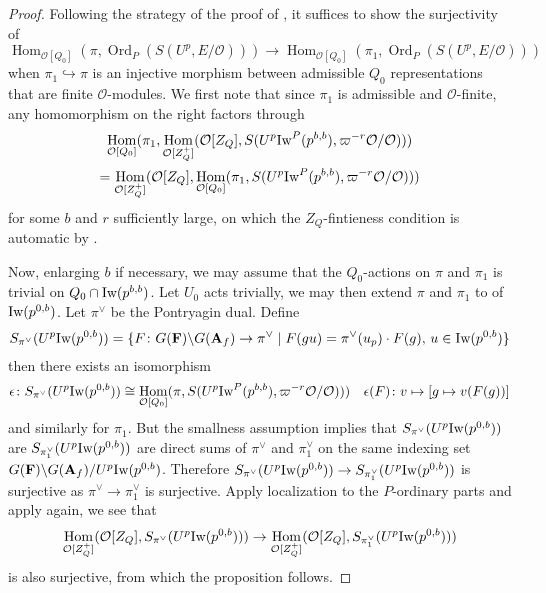 \documentclass[leqno]{amsart}
\newcommand{\Iw}{\textnormal{Iw}}
\DeclareMathOperator{\Ord}{Ord}
\newcommand{\A}{\mathbf A}
\newcommand{\F}{{\mathbf{F}}} %
\newcommand{\oo}{\mathcal{O}} %
\DeclareMathOperator{\Hom}{Hom}
\theoremstyle{definition}
\theoremstyle{remark}
\begin{document}
\begin{proof}
	Following the strategy of the proof of 
	\cite[Prop 3.2.4]{pan}, 
	it suffices to show the surjectivity of
	\[
		\Hom_{\oo[Q_0]}(\pi,\Ord_P(S(U^p,E/\oo)))\to 
		\Hom_{\oo[Q_0]}(\pi_1,\Ord_P(S(U^p,E/\oo)))
	\]
	when $\pi_{1}\hookrightarrow \pi$ 
	is an injective morphism between admissible $Q_0$
	representations that are finite $\oo$-modules.
	We first note that since $\pi_1$ is admissible
	and $\oo$-finite,
	any homomorphism on the right factors 
	through 
	\begin{multline*}
		\Hom_{\oo[Q_0]}(\pi_1,
		\Hom_{\oo[Z_Q^+]}
		(\oo[Z_Q], S(U^p\Iw^P(p^{b,b}),
		\varpi^{-r}\oo/\oo)))\\=
		\Hom_{\oo[Z_Q^+]}(\oo[Z_Q],
		\Hom_{\oo[Q_0]}(\pi_1, 
		S(U^p\Iw^P(p^{b,b}),\varpi^{-r}\oo/\oo)))
	\end{multline*}
	for some $b$ and  $r$ sufficiently large,
	on which 
	the $Z_Q$-fintieness condition is automatic
	by \cite[Lem 3.1.5]{emeI}.

	Now, enlarging $b$ if necessary,
	we may assume that 
	the $Q_0$-actions on 
	$\pi$ and $\pi_1$ is trivial on
	$Q_0\cap \Iw(p^{b,b})$. 
	Let $U_0$ acts trivially,
	we may then extend $\pi$ and  $\pi_1$
	to of $\Iw(p^{0,b})$.
	Let $\pi^\vee$ be the Pontryagin dual.
	Define
	\[
		S_{\pi^\vee}(U^p\Iw(p^{0,b}))=
		\{
			F\colon G(\F)\backslash G(\A_f)\to 
			\pi^\vee\mid 
			F(gu)=\pi^\vee(u_p)\cdot F(g),\,
			u\in \Iw(p^{0,b})
		\}
	\]
	then there exists an isomorphism
	\[
		\epsilon\colon 
		S_{\pi^\vee}(U^p\Iw(p^{0,b}))\cong 
		\Hom_{\oo[Q_0]}(\pi,
		S(U^p\Iw^P(p^{b,b}),\varpi^{-r}\oo/\oo)))
		\quad \epsilon(F)\colon
		v\mapsto [g\mapsto v(F(g))]
	\]
	and similarly for $\pi_1$.
	But the smallness assumption implies
	that $S_{\pi^\vee}(U^p\Iw(p^{0,b}))$
	are $S_{\pi_1^\vee}(U^p\Iw(p^{0,b}))$
	are direct sums of 
	$\pi^\vee$ and  $\pi_1^\vee$ 
	on the same indexing set
	$G(\F)\backslash G(\A_f)/U^p\Iw(p^{0,b})$.
	Therefore 
	$S_{\pi^\vee}(U^p\Iw(p^{0,b}))\to 
	S_{\pi_1^\vee}(U^p\Iw(p^{0,b}))$ is 
	surjective
	as $\pi^\vee\to \pi_1^\vee$ is surjective.
	Apply localization to the $P$-ordinary parts
	and apply \cite[Lem 3.1.5]{emeI} again,
	we see that
	\[
		\Hom_{\oo[Z_Q^+]}(\oo[Z_Q],
		S_{\pi^\vee}(U^p\Iw(p^{0,b})))\to 
		\Hom_{\oo[Z_Q^+]}(\oo[Z_Q],
		S_{\pi^\vee_1}(U^p\Iw(p^{0,b})))
	\]
	is also surjective, from which 
	the proposition follows.
\end{proof}
\end{document}
